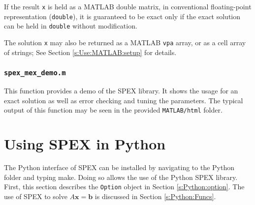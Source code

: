 \documentclass[12pt,oneside]{book}
\theoremstyle{definition}
\renewcommand{\b}{\mathbf{b}}
\newcommand{\x}{\mathbf{x}}
\begin{document}
If the result \verb|x| is held as a MATLAB double matrix, in conventional
floating-point representation (\verb|double|), it is guaranteed to be exact
only if the exact solution can be held in \verb|double| without modification.

The solution \verb|x| may also be returned as a MATLAB \verb|vpa| array, or as
a cell array of strings; See Section \ref{s:Use:MATLAB:setup} for details.


\subsection{\texttt{spex\_mex\_demo.m}}
This function provides a demo of the SPEX library. It shows the usage for an exact
solution as well as error checking and tuning the parameters. The typical output
of this function may be seen in the provided \verb|MATLAB/html| folder.



\chapter{Using SPEX in Python}\vspace{-0.75in}
The Python interface of SPEX can be installed by navigating to the Python folder and typing make. Doing so allows the use of the Python SPEX library. First, this section describes the \verb|Option| object in Section \ref{s:Python:option}. The use of SPEX to solve $A\x=\b$ is discussed in Section \ref{s:Python:Funcs}.


\end{document}
